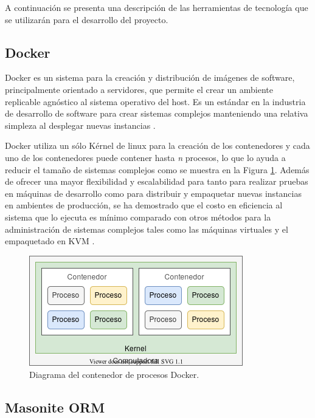 
A continuación se presenta una descripción de las herramientas de tecnología que se utilizarán para el desarrollo del proyecto.

\subsection{Docker}

Docker es un sistema para la creación y distribución de imágenes de software, principalmente orientado a servidores, que permite el crear un ambiente replicable agnóstico al sistema operativo del host. Es un estándar en la industria de desarrollo de software para crear sistemas complejos manteniendo una relativa simpleza al desplegar nuevas instancias \cite{rad2017dockerAnalysis}.


Docker utiliza un sólo Kérnel de linux para la creación de los contenedores y cada uno de los contenedores puede contener hasta \textit{n} procesos, lo que lo ayuda a reducir el tamaño de sistemas complejos como se muestra en la Figura \ref{fig:docker_diagrama}. Además de ofrecer una mayor flexibilidad y escalabilidad para tanto para realizar pruebas en máquinas de desarrollo como para distribuir y empaquetar nuevas instancias en ambientes de producción, se ha demostrado que el costo en eficiencia al sistema que lo ejecuta es mínimo comparado con otros métodos para la administración de sistemas complejos tales como las máquinas virtuales y el empaquetado en KVM \cite{rad2017dockerAnalysis, felter2015comparsionPerformance}.

\begin{figure}[!ht]
	\centering
	\includegraphics[width=.45\linewidth]{images/diagrams/docker.png}
	\caption{Diagrama del contenedor de procesos Docker.}
	\label{fig:docker_diagrama}
\end{figure}

\subsection{Masonite ORM}


